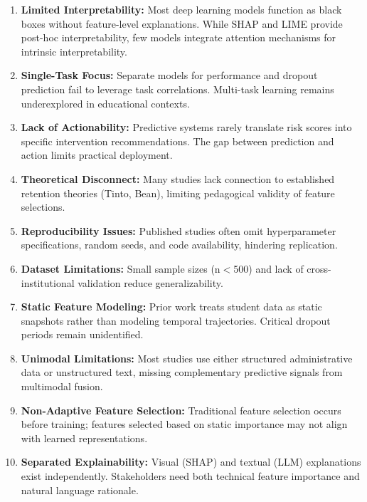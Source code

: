 \begin{enumerate}
\item \textbf{Limited Interpretability:} Most deep learning models function as black boxes without feature-level explanations. While SHAP and LIME provide post-hoc interpretability, few models integrate attention mechanisms for intrinsic interpretability.

\item \textbf{Single-Task Focus:} Separate models for performance and dropout prediction fail to leverage task correlations. Multi-task learning remains underexplored in educational contexts.

\item \textbf{Lack of Actionability:} Predictive systems rarely translate risk scores into specific intervention recommendations. The gap between prediction and action limits practical deployment.

\item \textbf{Theoretical Disconnect:} Many studies lack connection to established retention theories (Tinto, Bean), limiting pedagogical validity of feature selections.

\item \textbf{Reproducibility Issues:} Published studies often omit hyperparameter specifications, random seeds, and code availability, hindering replication.

\item \textbf{Dataset Limitations:} Small sample sizes (n$<$500) and lack of cross-institutional validation reduce generalizability.

\item \textbf{Static Feature Modeling:} Prior work treats student data as static snapshots rather than modeling temporal trajectories. Critical dropout periods remain unidentified.

\item \textbf{Unimodal Limitations:} Most studies use either structured administrative data or unstructured text, missing complementary predictive signals from multimodal fusion.

\item \textbf{Non-Adaptive Feature Selection:} Traditional feature selection occurs before training; features selected based on static importance may not align with learned representations.

\item \textbf{Separated Explainability:} Visual (SHAP) and textual (LLM) explanations exist independently. Stakeholders need both technical feature importance and natural language rationale.
\end{enumerate}

